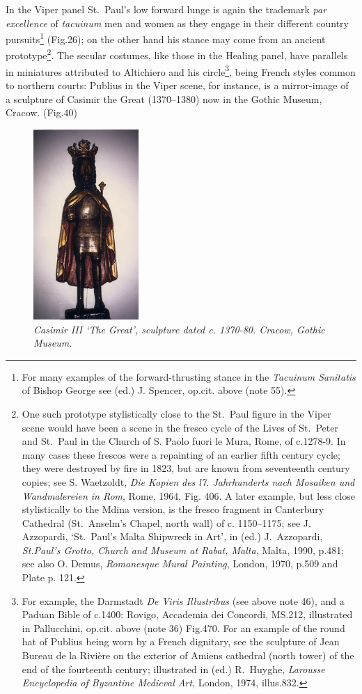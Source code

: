 \documentclass[a4paper,12pt]{article}
\begin{document}
In the Viper panel St.~Paul's low forward lunge is again the trademark
\textit{par excellence} of \textit{tacuinum} men and women as they
engage in their different country pursuits\footnote{For many examples
of the forward-thrusting stance in the \textit{Tacuinum Sanitatis} of
Bishop George see (ed.) J. Spencer, op.cit. above (note 55).}
(Fig.26); on the other hand his stance may come from an ancient
prototype\footnote{One such prototype stylistically close to the
St.~Paul figure in the Viper scene would have been a scene in the
fresco cycle of the Lives of St.~Peter and St.~Paul in the Church of
S. Paolo fuori le Mura, Rome, of c.1278-9. In many cases these frescos
were a repainting of an earlier fifth century cycle; they were
destroyed by fire in 1823, but are known from seventeenth century
copies; see S. Waetzoldt, \textit{Die Kopien des l7. Jahrhunderts nach
Mosaiken und Wandmalereien in Rom}, Rome, 1964, Fig. 406. A later
example, but less close stylistically to the Mdina version, is the
fresco fragment in Canterbury Cathedral (St.~Anselm's Chapel, north
wall) of c. 1150--1175; see J. Azzopardi, `St.~Paul's Malta Shipwreck
in Art', in (ed.)  J.~Azzopardi, \textit{St.Paul's Grotto, Church and
Museum at Rabat, Malta}, Malta, 1990, p.481; see also O. Demus,
\textit{Romanesque Mural Painting}, London, 1970, p.509 and Plate
p. 121.}. The secular costumes, like those in the Healing panel, have
parallels in miniatures attributed to Altichiero and his
circle\footnote{For example, the Darmstadt \textit{De Viris
Illustribus} (see above note 46), and a Paduan Bible of c.1400:
Rovigo, Accademia dei Concordi, MS.212, illustrated in Pallucchini,
op.cit. above (note 36) Fig.470. For an example of the round hat of
Publius being worn by a French dignitary, see the sculpture of Jean
Bureau de la Rivi\`ere on the exterior of Amiens cathedral (north tower)
of the end of the fourteenth century; illustrated in (ed.) R.~Huyghe,
\textit{Larousse Encyclopedia of Byzantine Medieval Art}, London,
1974, illus.832.}, being French styles common to northern courts:
Publius in the Viper scene, for instance, is a mirror-image of a
sculpture of Casimir the Great (1370--1380) now in the Gothic Museum,
Cracow. (Fig.40) 
\begin{figure}[htbp]
\centering
\includegraphics[width=4cm]{pics/fig40.png}
\caption[Casimir III `The Great', sculpture dated c. 1370-80] 
{\it Casimir III `The Great', sculpture dated c. 1370-80.  Cracow, Gothic
Museum.}
\end{figure}
\end{document}

